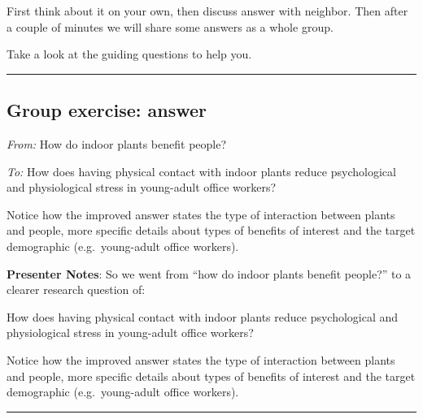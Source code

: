 \documentclass[
  letterpaper,
  DIV=11,
  numbers=noendperiod]{scrartcl}
\begin{document}
First think about it on your own, then discuss answer with neighbor.
Then after a couple of minutes we will share some answers as a whole
group.

Take a look at the guiding questions to help you.

\begin{center}\rule{0.5\linewidth}{0.5pt}\end{center}

\subsection{Group exercise: answer}\label{group-exercise-answer}

\emph{From:} How do indoor plants benefit people?

\emph{To:} How does having physical contact with indoor plants reduce
psychological and physiological stress in young-adult office workers?

\begin{tcolorbox}[enhanced jigsaw, arc=.35mm, bottomrule=.15mm, bottomtitle=1mm, breakable, colback=white, colbacktitle=quarto-callout-note-color!10!white, colframe=quarto-callout-note-color-frame, coltitle=black, left=2mm, leftrule=.75mm, opacityback=0, opacitybacktitle=0.6, rightrule=.15mm, title=\textcolor{quarto-callout-note-color}{\faInfo}\hspace{0.5em}{Note}, titlerule=0mm, toprule=.15mm, toptitle=1mm]

Notice how the improved answer states the type of interaction between
plants and people, more specific details about types of benefits of
interest and the target demographic (e.g.~young-adult office workers).

\end{tcolorbox}

\textbf{Presenter Notes}: So we went from ``how do indoor plants benefit
people?'' to a clearer research question of:

How does having physical contact with indoor plants reduce psychological
and physiological stress in young-adult office workers?

Notice how the improved answer states the type of interaction between
plants and people, more specific details about types of benefits of
interest and the target demographic (e.g.~young-adult office workers).

\begin{center}\rule{0.5\linewidth}{0.5pt}\end{center}
\end{document}
